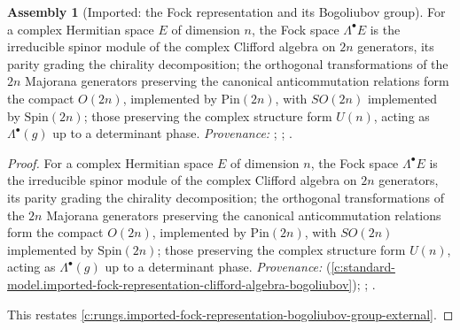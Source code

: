 \documentclass[11pt]{article}
\theoremstyle{definition}
\newtheorem{assembled}[theorem]{Assembly}
\theoremstyle{plain}
\begin{document}
\begin{assembled}[Imported: the Fock representation and its Bogoliubov group]\label{c:rungs.imported-fock-representation-bogoliubov-group}
For a complex Hermitian space $E$ of dimension $n$, the Fock space $\Lambda^{\bullet}E$ is the irreducible spinor module of the complex Clifford algebra on $2n$ generators, its parity grading the chirality decomposition; the orthogonal transformations of the $2n$ Majorana generators preserving the canonical anticommutation relations form the compact $O(2n)$, implemented by $\mathrm{Pin}(2n)$, with $SO(2n)$ implemented by $\mathrm{Spin}(2n)$; those preserving the complex structure form $U(n)$, acting as $\Lambda^{\bullet}(g)$ up to a determinant phase. \emph{Provenance:} \cite[Fact~2.11]{ButlerT12}; \cite[Lecture~20]{FultonHarris1991}; \cite[Ch.~I, \S\S 2, 5]{LawsonMichelsohn1989}.
\end{assembled}
\begin{proof}
For a complex Hermitian space $E$ of dimension $n$, the Fock space $\Lambda^{\bullet}E$ is the irreducible spinor module of the complex Clifford algebra on $2n$ generators, its parity grading the chirality decomposition; the orthogonal transformations of the $2n$ Majorana generators preserving the canonical anticommutation relations form the compact $O(2n)$, implemented by $\mathrm{Pin}(2n)$, with $SO(2n)$ implemented by $\mathrm{Spin}(2n)$; those preserving the complex structure form $U(n)$, acting as $\Lambda^{\bullet}(g)$ up to a determinant phase. \emph{Provenance:} \cite[Fact~2.11]{ButlerT12} (\ref{c:standard-model.imported-fock-representation-clifford-algebra-bogoliubov}); \cite[Lecture~20]{FultonHarris1991}; \cite[Ch.~I, \S\S 2, 5]{LawsonMichelsohn1989}.

This restates \ref{c:rungs.imported-fock-representation-bogoliubov-group-external}.

\end{proof}
\end{document}
